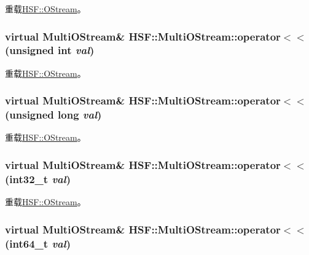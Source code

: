 重载\hyperlink{classHSF_1_1OStream_a8c3d22e78a10c990e136c1514dfc99c6}{HSF::OStream}。\hypertarget{classHSF_1_1MultiOStream_a62badc16d7c2ac1ec092032698202938}{
\subsubsection[{operator$<$$<$}]{\setlength{\rightskip}{0pt plus 5cm}virtual {\bf MultiOStream}\& HSF::MultiOStream::operator$<$$<$ (unsigned int {\em val})}}
\label{classHSF_1_1MultiOStream_a62badc16d7c2ac1ec092032698202938}


重载\hyperlink{classHSF_1_1OStream_aa0cd93dd86633a0603d09d35e20c9520}{HSF::OStream}。\hypertarget{classHSF_1_1MultiOStream_a40a0605bc99045578fccf9c5413411f5}{
\subsubsection[{operator$<$$<$}]{\setlength{\rightskip}{0pt plus 5cm}virtual {\bf MultiOStream}\& HSF::MultiOStream::operator$<$$<$ (unsigned long {\em val})}}
\label{classHSF_1_1MultiOStream_a40a0605bc99045578fccf9c5413411f5}


重载\hyperlink{classHSF_1_1OStream_ae4edb4f375ace6dab22021629c29a24f}{HSF::OStream}。\hypertarget{classHSF_1_1MultiOStream_a83208fee91d9117cf7411cd63477c9fe}{
\subsubsection[{operator$<$$<$}]{\setlength{\rightskip}{0pt plus 5cm}virtual {\bf MultiOStream}\& HSF::MultiOStream::operator$<$$<$ (int32\_\-t {\em val})}}
\label{classHSF_1_1MultiOStream_a83208fee91d9117cf7411cd63477c9fe}


重载\hyperlink{classHSF_1_1OStream_a1bbf47f6f3c68938fb4c1006b878aa60}{HSF::OStream}。\hypertarget{classHSF_1_1MultiOStream_a960936ac105e7f2ed4801f0725dedfba}{
\subsubsection[{operator$<$$<$}]{\setlength{\rightskip}{0pt plus 5cm}virtual {\bf MultiOStream}\& HSF::MultiOStream::operator$<$$<$ (int64\_\-t {\em val})}}
\label{classHSF_1_1MultiOStream_a960936ac105e7f2ed4801f0725dedfba}


